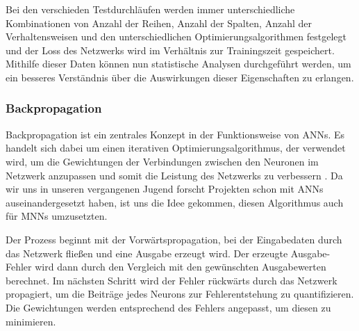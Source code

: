     
    
    

Bei den verschieden Testdurchläufen werden immer unterschiedliche Kombinationen von Anzahl der Reihen, Anzahl der Spalten, Anzahl der Verhaltensweisen und den unterschiedlichen Optimierungsalgorithmen festgelegt und der Loss des Netzwerks wird im Verhältnis zur Trainingszeit gespeichert. Mithilfe dieser Daten können nun statistische Analysen durchgeführt werden, um ein besseres Verständnis über die Auswirkungen dieser Eigenschaften zu erlangen.

\subsubsection{Backpropagation}

Backpropagation ist ein zentrales Konzept in der Funktionsweise von ANNs.
Es handelt sich dabei um einen iterativen Optimierungsalgorithmus, der verwendet wird, um die Gewichtungen der Verbindungen zwischen den Neuronen im Netzwerk anzupassen und somit die Leistung des Netzwerks zu verbessern \cite{brotcrunsher:backwardpass}. Da wir uns in unseren vergangenen Jugend forscht Projekten schon mit ANNs auseinandergesetzt haben, ist uns die Idee gekommen, diesen Algorithmus auch für MNNs umzusetzten.

Der Prozess beginnt mit der Vorwärtspropagation, bei der Eingabedaten durch das Netzwerk fließen und eine Ausgabe erzeugt wird. Der erzeugte Ausgabe-Fehler wird dann durch den Vergleich mit den gewünschten Ausgabewerten berechnet. Im nächsten Schritt wird der Fehler rückwärts durch das Netzwerk propagiert, um die Beiträge jedes Neurons zur Fehlerentstehung zu quantifizieren.
Die Gewichtungen werden entsprechend des Fehlers angepasst, um diesen zu minimieren.

